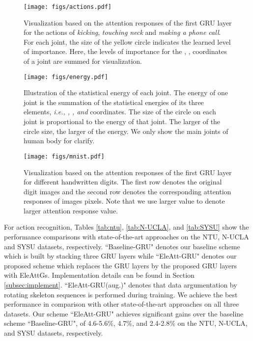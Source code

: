 \documentclass[journal]{IEEEtran}
\newcommand{\EleAttGn}{{EleAttG}}
\begin{document}
\begin{figure*}[th]
	\centering
	\texttt{[image: figs/actions.pdf]}
	\caption{Visualization based on the attention responses of the first GRU layer for the actions of \emph{kicking}, \emph{touching neck} and \emph{making a phone call}. For each joint, the size of the yellow circle indicates the learned level of importance. Here, the levels of importance for the , ,  coordinates of a joint are summed for visualization.}	
	\label{fig:vis}
\end{figure*}

\begin{figure}[!]
	\centering
	\texttt{[image: figs/energy.pdf]}
	\caption{Illustration of the statistical energy of each joint. The energy of one joint is the summation of the statistical energies of its three elements, {\it i.e., , , and } coordinates. The size of the circle on each joint is proportional to the energy of that joint. The larger of the circle size, the larger of the energy. We only show the main joints of human body for clarify.}	
	\label{fig:energy}
\end{figure}


\begin{figure*}[th]
	\centering
	\texttt{[image: figs/mnist.pdf]}
	\caption{Visualization based on the attention responses of the first GRU layer for different handwritten digits. The first row denotes the original digit images and the second row denotes the corresponding attention responses of images pixels. Note that we use larger value to denote larger attention response value.}	
	\label{fig:mnist}
\end{figure*}

For action recognition, Tables \ref{tab:ntu}, \ref{tab:N-UCLA}, and \ref{tab:SYSU} show the performance comparisons with state-of-the-art approaches on the NTU, N-UCLA and SYSU datasets, respectively. ``Baseline-GRU" denotes our baseline scheme which is built by stacking three GRU layers while ``EleAtt-GRU" denotes our proposed scheme which replaces the GRU layers by the proposed GRU layers with {\EleAttGn}s. Implementation details can be found in Section \ref{subsec:implement}.  ``EleAtt-GRU(aug.)" denotes that data argumentation by rotating skeleton sequences is performed during training. We achieve the best performance in comparison with other state-of-the-art approaches on all three datasets. Our scheme ``EleAtt-GRU" achieves significant gains over the baseline scheme ``Baseline-GRU", of 4.6-5.6\%, 4.7\%, and 2.4-2.8\% on the NTU, N-UCLA, and SYSU datasets, respectively. 
\end{document}
